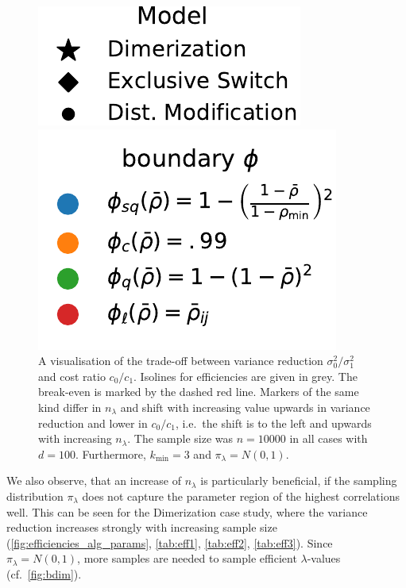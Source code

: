 \begin{figure}[tb]
\begin{minipage}{\textwidth}
    \end{minipage}
    \hfill
    \begin{minipage}{.4\textwidth}
	    \vfill
    \includegraphics[scale=.5]{gfx/legend_models.pdf}
	    \vfill
    \end{minipage}
    \begin{minipage}{.4\textwidth}
	    \vfill
    \includegraphics[scale=.5]{gfx/legend_phi.pdf}
	    \vfill
    \end{minipage}
    \hfill
    \caption[Cost \& variance reduction trade-off]{A visualisation of the trade-off between variance reduction $\sigma_0^2/\sigma_1^2$
    and cost ratio $c_0/c_1$. Isolines for efficiencies are given in grey. The break-even
    is marked by the dashed red line.
    Markers of the same kind differ in $n_{\lambda}$ and shift with increasing value
    upwards in variance reduction and lower in $c_0/c_1$, i.e.\ the shift is to the left and upwards
    with increasing $n_{\lambda}$.
	The sample size was $n=\num{10000}$ in all cases
    with $d=100$. Furthermore, $k_{\min}=3$ and $\pi_\lambda=N(0,1)$.}
    \label{fig:trade_off}
\end{figure}

We also observe, that an increase of $n_{\lambda}$ is particularly beneficial, if
the sampling distribution $\pi_{\lambda}$ does not capture the parameter region of
the highest correlations well.
This can be seen for the Dimerization case study, where the variance reduction increases
strongly with increasing sample size (\autoref{fig:efficiencies_alg_params}, \autoref{tab:eff1}, \autoref{tab:eff2}, \autoref{tab:eff3}).
Since $\pi_{\lambda}=N(0,1)$, more samples are needed to sample efficient $\lambda$-values (cf.\ \autoref{fig:bdim}).

